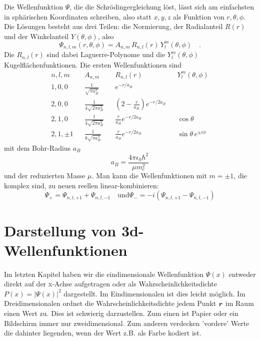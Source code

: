 Die Wellenfunktion $\Psi$, die die Schrödingergleichung löst, lässt sich am einfachsten in sphärischen Koordinaten schreiben, also statt $x,y,z$ als Funktion von $r,  \theta, \phi$. Die Lösungen besteht aus   drei Teilen: die Normierung, der Radialanteil $R(r)$ und der Winkelanteil $Y(\theta, \phi)$, also 
\begin{equation}
    \Psi_{n,l,m} (r, \theta, \phi) = A_{n,m} \, R_{n,l}(r) \, Y_l^m (\theta, \phi) \quad .
\end{equation}
Die $R_{n,l}(r)$ sind dabei Laguerre-Polynome und die $Y_l^m(\theta, \phi)$ Kugelflächenfunktionen.
Die ersten Wellenfunktionen sind
\begin{align}
    n,l,m  & & A_{n,m}                      & &R_{n,l}(r) & & Y_l^m(\theta, \phi) \\
   1,0,0   && \frac{1}{\sqrt{\pi a_B^3}}    & &e^{-r / a_B} && \\
    2,0,0  & & \frac{1}{4 \sqrt{2 \pi a_B^3}}   & & \left( 2 - \frac{r}{a_B}\right) e^{-r /2 a_B} && \\
    2,1,0  & & \frac{1}{4 \sqrt{2 \pi a_B^3}}   & & \frac{r}{a_B} e^{-r /2 a_B} && \cos \theta \\
    2,1,\pm 1  & & \frac{1}{8 \sqrt{\pi a_B^3}}   & & \frac{r}{a_B} e^{-r /2 a_B} && \sin \theta \, e^{\pm i \phi} 
\end{align}
mit dem Bohr-Radius $a_B$
\begin{equation}
    a_B = \frac{4 \pi \epsilon_0 \hbar^2}{\mu m_e^2}
\end{equation}
und der reduzierten Masse $\mu$. Man kann die Wellenfunktionen mit $m = \pm 1$, die  komplex sind, zu neuen reellen linear-kombinieren:
\begin{equation}
    \Psi_{+} = \Psi_{n,l,+1} +  \Psi_{n,l,-1} \quad \text{und} \Psi_{-} = -i \left( \Psi_{n,l,+1} -  \Psi_{n,l,-1}  \right)
\end{equation}

\section{Darstellung von 3d-Wellenfunktionen}

Im letzten Kapitel haben wir die eindimensionale Wellenfunktion $\Psi(x)$ entweder direkt auf der x-Achse aufgetragen oder als Wahrscheinlichkeitsdichte $P(x) = |\Psi(x)|^2$ dargestellt. Im Eindimensionalen ist dies leicht möglich. Im Dreidimensionalen ordnet die Wahrscheinlichkeitsdichte jedem Punkt $\boldsymbol{r}$ im Raum einen Wert zu. Dies ist schwierig darzustellen. Zum einen ist Papier oder ein Bildschirm immer nur zweidimensional. Zum anderen verdecken 'vordere' Werte die dahinter liegenden, wenn der Wert z.B. als Farbe kodiert ist.

